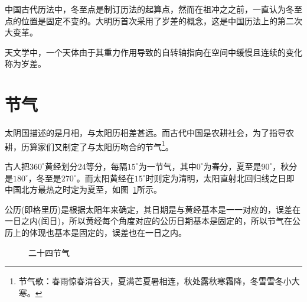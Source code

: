 中国古代历法中，冬至点是制订历法的起算点，然而在祖冲之之前，一直认为冬至点的位置是固定不变的。大明历首次采用了岁差的概念，这是中国历法上的第二次大变革。

\begin{definition}
  天文学中，一个天体由于其重力作用导致的自转轴指向在空间中缓慢且连续的变化称为岁差。
\end{definition}


\section{节气}
\label{sec:jie-qi}

太阴国描述的是月相，与太阳历相差甚远。而古代中国是农耕社会，为了指导农耕，历算家们又制定了与太阳历吻合的节气\footnote{节气歌：春雨惊春清谷天，夏满芒夏暑相连，秋处露秋寒霜降，冬雪雪冬小大寒。}。

古人把$360^\circ$黄经划分24等分，每隔$15^\circ$为一节气，其中$0^\circ$为春分，夏至是$90^\circ$，秋分是$180^\circ$，冬至是$270^\circ$。而太阳黄经在$15^\circ$时则定为清明，太阳直射北回归线之日即中国北方最热之时定为夏至，如图~\ref{fig:24-jie-qi}所示。

公历(即格里历)是根据太阳年来确定，其日期是与黄经基本是一一对应的，误差在一日之内(闰日)，所以黄经每个角度对应的公历日期基本是固定的，所以节气在公历上的体现也基本是固定的，误差也在一日之内。

\begin{figure}[htbp]
  \centering
  \caption{二十四节气}
  \label{fig:24-jie-qi}
\end{figure}

